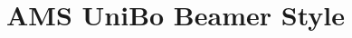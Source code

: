 \newcommand{\swatch}[1]{\fcolorbox{amsgreyline}{#1}{\rule{0pt}{1.3ex}\rule{2.2ex}{0pt}}}
\newcommand{\swgroup}[1]{\multicolumn{2}{@{}l}{\textcolor{amsgreendark}{\textbf{#1}}}}
\title[AMS UniBo Beamer Style]
{AMS UniBo Beamer Style}
